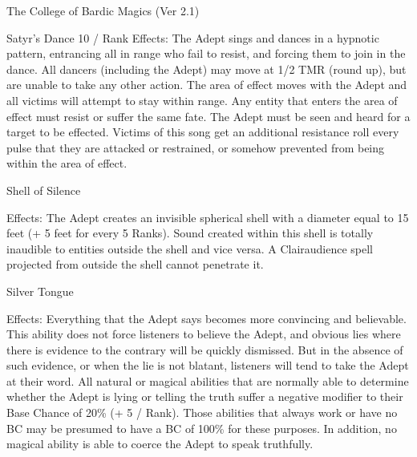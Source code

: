 \begin{Chapter}{The College of Bardic Magics (Ver 2.1)}
\begin{spell}[S-9]{Satyr’s Dance}
10 / Rank 
Effects: The  Adept sings and dances in a hypnotic 
pattern,  entrancing  all  in  range  who  fail  to  resist, 
and  forcing  them to  join  in the  dance.  All  dancers 
(including  the  Adept)  may  move  at  1/2  TMR 
(round up), but are unable to take any other action. 
The  area  of  effect  moves  with  the  Adept  and  all 
victims  will  attempt  to  stay  within  range.  Any 
entity  that  enters  the  area  of  effect  must  resist  or 
suffer  the  same  fate.  The  Adept  must  be  seen  and 
heard  for  a  target  to  be  effected.  Victims  of  this 
song  get  an  additional  resistance  roll  every  pulse 
that  they  are  attacked  or  restrained,  or  somehow 
prevented from being within the area of effect. 
\end{spell}

\begin{spell}[S-10]{Shell of Silence }

Effects:  The  Adept  creates  an  invisible  spherical 
shell  with a diameter equal to 15 feet (+ 5 feet for 
every  5  Ranks).  Sound  created  within  this  shell  is 
totally  inaudible  to  entities  outside  the  shell  and 
vice  versa.  A  Clairaudience  spell  projected  from 
outside the shell cannot penetrate it. 
\end{spell}

\begin{spell}[S-11]{Silver Tongue }


Effects:  Everything  that  the  Adept  says  becomes 
more  convincing  and  believable.  This  ability  does 
not  force  listeners  to  believe  the  Adept,  and  obvious lies where there is evidence to the contrary will 
be  quickly  dismissed.  But  in  the  absence  of  such 
evidence,  or  when  the  lie  is  not  blatant,  listeners 
will tend to take the Adept at their word. All natural  or  magical  abilities  that  are  normally  able  to 
determine whether the Adept is lying or telling the 
truth  suffer  a  negative  modifier  to  their  Base 
Chance  of  20\%  (+  5  /  Rank).  Those  abilities  that 
always  work  or  have  no  BC  may  be  presumed  to 
have a BC of 100\% for these purposes. In addition, 
no  magical  ability  is  able  to  coerce  the  Adept  to 
speak truthfully. 
\end{spell}


\end{Chapter}
